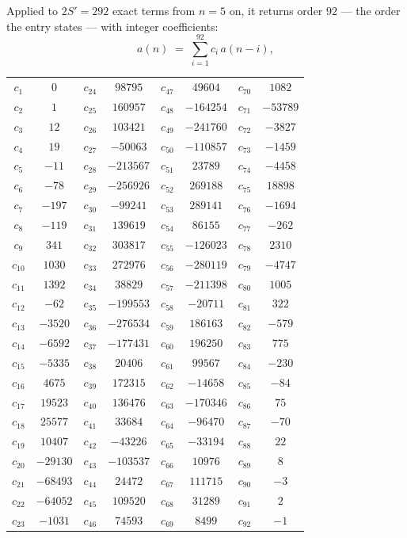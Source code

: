\documentclass[11pt,a4paper]{article}
\theoremstyle{plain}
\theoremstyle{definition}
\begin{document}
Applied to $2S'=292$ exact terms from $n=5$ on, it returns order $92$ --- the
order the entry states --- with integer coefficients:
\[
a(n)\;=\;\sum_{i=1}^{92}c_i\,a(n-i),
\]
\begin{center}\small
\begin{tabular}{cccccccc}
$c_{1}$ & $0$ & $c_{24}$ & $98795$ & $c_{47}$ & $49604$ & $c_{70}$ & $1082$ \\
$c_{2}$ & $1$ & $c_{25}$ & $160957$ & $c_{48}$ & $-164254$ & $c_{71}$ & $-53789$ \\
$c_{3}$ & $12$ & $c_{26}$ & $103421$ & $c_{49}$ & $-241760$ & $c_{72}$ & $-3827$ \\
$c_{4}$ & $19$ & $c_{27}$ & $-50063$ & $c_{50}$ & $-110857$ & $c_{73}$ & $-1459$ \\
$c_{5}$ & $-11$ & $c_{28}$ & $-213567$ & $c_{51}$ & $23789$ & $c_{74}$ & $-4458$ \\
$c_{6}$ & $-78$ & $c_{29}$ & $-256926$ & $c_{52}$ & $269188$ & $c_{75}$ & $18898$ \\
$c_{7}$ & $-197$ & $c_{30}$ & $-99241$ & $c_{53}$ & $289141$ & $c_{76}$ & $-1694$ \\
$c_{8}$ & $-119$ & $c_{31}$ & $139619$ & $c_{54}$ & $86155$ & $c_{77}$ & $-262$ \\
$c_{9}$ & $341$ & $c_{32}$ & $303817$ & $c_{55}$ & $-126023$ & $c_{78}$ & $2310$ \\
$c_{10}$ & $1030$ & $c_{33}$ & $272976$ & $c_{56}$ & $-280119$ & $c_{79}$ & $-4747$ \\
$c_{11}$ & $1392$ & $c_{34}$ & $38829$ & $c_{57}$ & $-211398$ & $c_{80}$ & $1005$ \\
$c_{12}$ & $-62$ & $c_{35}$ & $-199553$ & $c_{58}$ & $-20711$ & $c_{81}$ & $322$ \\
$c_{13}$ & $-3520$ & $c_{36}$ & $-276534$ & $c_{59}$ & $186163$ & $c_{82}$ & $-579$ \\
$c_{14}$ & $-6592$ & $c_{37}$ & $-177431$ & $c_{60}$ & $196250$ & $c_{83}$ & $775$ \\
$c_{15}$ & $-5335$ & $c_{38}$ & $20406$ & $c_{61}$ & $99567$ & $c_{84}$ & $-230$ \\
$c_{16}$ & $4675$ & $c_{39}$ & $172315$ & $c_{62}$ & $-14658$ & $c_{85}$ & $-84$ \\
$c_{17}$ & $19523$ & $c_{40}$ & $136476$ & $c_{63}$ & $-170346$ & $c_{86}$ & $75$ \\
$c_{18}$ & $25577$ & $c_{41}$ & $33684$ & $c_{64}$ & $-96470$ & $c_{87}$ & $-70$ \\
$c_{19}$ & $10407$ & $c_{42}$ & $-43226$ & $c_{65}$ & $-33194$ & $c_{88}$ & $22$ \\
$c_{20}$ & $-29130$ & $c_{43}$ & $-103537$ & $c_{66}$ & $10976$ & $c_{89}$ & $8$ \\
$c_{21}$ & $-68493$ & $c_{44}$ & $24472$ & $c_{67}$ & $111715$ & $c_{90}$ & $-3$ \\
$c_{22}$ & $-64052$ & $c_{45}$ & $109520$ & $c_{68}$ & $31289$ & $c_{91}$ & $2$ \\
$c_{23}$ & $-1031$ & $c_{46}$ & $74593$ & $c_{69}$ & $8499$ & $c_{92}$ & $-1$ \\
\end{tabular}
\end{center}
\end{document}
